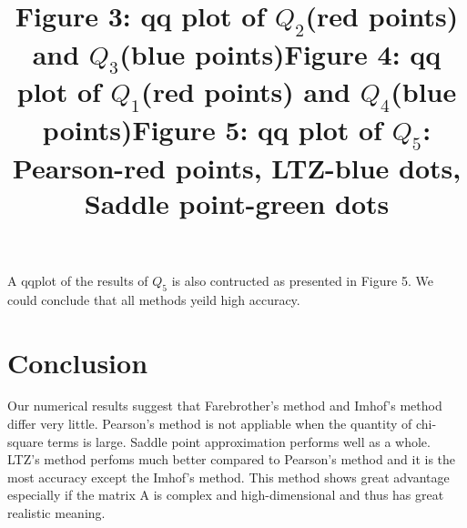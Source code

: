 \documentclass[paper=a4]{article}
\numberwithin{equation}{section}
\begin{document}
A qqplot of the results of $Q_5$ is also contructed as presented in Figure 5. We could conclude that all methods yeild high accuracy.
\begin{figure}
	\begin{center}
		\title{Figure 3: qq plot of $Q_2$(red points) and $Q_3$(blue points)}
	\end{center}
\end{figure}
\begin{figure}[h]
	\begin{center}
		\title{Figure 4: qq plot of $Q_1$(red points) and $Q_4$(blue points)}
	\end{center}
\end{figure}
	\begin{center}
		
		\title{Figure 5: qq plot of $Q_5$: Pearson-red points, LTZ-blue dots, Saddle point-green dots}
	\end{center}

\clearpage
\section{Conclusion}
Our numerical results suggest that Farebrother's method and Imhof's method differ very little. Pearson's method is not appliable when the quantity of chi-square terms is large. Saddle point approximation performs well as a whole. LTZ's method perfoms much better compared to Pearson's method and it is the most accuracy except the Imhof's method. This method shows great advantage especially if the matrix A is complex and high-dimensional and thus has great realistic meaning. 
\end{document}
